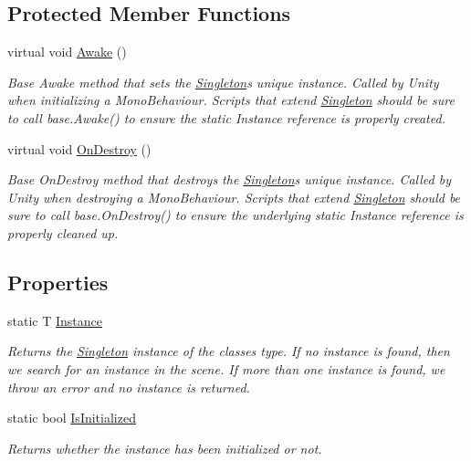 \subsection*{Protected Member Functions}
\begin{DoxyCompactItemize}
\item 
virtual void \mbox{\hyperlink{class_utilities_1_1_singleton_a634b915d7ac492899512de602d59e650}{Awake}} ()
\begin{DoxyCompactList}\small\item\em Base Awake method that sets the \mbox{\hyperlink{class_utilities_1_1_singleton}{Singleton}}\textquotesingle{}s unique instance. Called by Unity when initializing a Mono\+Behaviour. Scripts that extend \mbox{\hyperlink{class_utilities_1_1_singleton}{Singleton}} should be sure to call base.\+Awake() to ensure the static Instance reference is properly created. \end{DoxyCompactList}\item 
virtual void \mbox{\hyperlink{class_utilities_1_1_singleton_a2f20e07021a39a041e87e1a4906c77cb}{On\+Destroy}} ()
\begin{DoxyCompactList}\small\item\em Base On\+Destroy method that destroys the \mbox{\hyperlink{class_utilities_1_1_singleton}{Singleton}}\textquotesingle{}s unique instance. Called by Unity when destroying a Mono\+Behaviour. Scripts that extend \mbox{\hyperlink{class_utilities_1_1_singleton}{Singleton}} should be sure to call base.\+On\+Destroy() to ensure the underlying static Instance reference is properly cleaned up. \end{DoxyCompactList}\end{DoxyCompactItemize}
\subsection*{Properties}
\begin{DoxyCompactItemize}
\item 
static T \mbox{\hyperlink{class_utilities_1_1_singleton_a7b33f3dfee9e78908ad67a0b80eb3a61}{Instance}}
\begin{DoxyCompactList}\small\item\em Returns the \mbox{\hyperlink{class_utilities_1_1_singleton}{Singleton}} instance of the classes type. If no instance is found, then we search for an instance in the scene. If more than one instance is found, we throw an error and no instance is returned. \end{DoxyCompactList}\item 
static bool \mbox{\hyperlink{class_utilities_1_1_singleton_ae3d28b0d6fbd2091235b2b2cd17a4c9a}{Is\+Initialized}}
\begin{DoxyCompactList}\small\item\em Returns whether the instance has been initialized or not. \end{DoxyCompactList}\end{DoxyCompactItemize}


